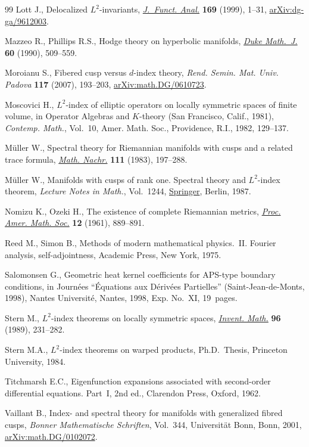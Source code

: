 \documentclass[10pt,a4paper]{amsart}
\numberwithin{equation}{section}
\begin{document}
\begin{thebibliography}{99}
Lott J., Delocalized {$L^2$}-invariants, \href{https://doi.org/10.1006/jfan.1999.3451}{\textit{J.~Funct. Anal.}} \textbf{169}
 (1999), 1--31, \href{https://arxiv.org/abs/dg-ga/9612003}{arXiv:dg-ga/9612003}.

Mazzeo R., Phillips R.S., Hodge theory on hyperbolic manifolds, \href{https://doi.org/10.1215/S0012-7094-90-06021-1}{\textit{Duke
 Math.~J.}} \textbf{60} (1990), 509--559.

Moroianu S., Fibered cusp versus {$d$}-index theory, \textit{Rend. Semin. Mat.
 Univ. Padova} \textbf{117} (2007), 193--203, \href{https://arxiv.org/abs/math.DG/0610723}{arXiv:math.DG/0610723}.

Moscovici H., {$L^{2}$}-index of elliptic operators on locally symmetric spaces
 of finite volume, in Operator Algebras and {$K$}-theory ({S}an {F}rancisco,
 {C}alif., 1981), \textit{Contemp. Math.}, Vol.~10, Amer. Math. Soc.,
 Providence, R.I., 1982, 129--137.

M\"uller W., Spectral theory for {R}iemannian manifolds with cusps and a
 related trace formula, \href{https://doi.org/10.1002/mana.19831110109}{\textit{Math. Nachr.}} \textbf{111} (1983), 197--288.

M\"uller W., Manifolds with cusps of rank one. {S}pectral theory and
 {$L^2$}-index theorem, \textit{Lecture Notes in Math.}, Vol.~1244,
 \href{https://doi.org/10.1007/BFb0077660}{Springer}, Berlin, 1987.

Nomizu K., Ozeki H., The existence of complete {R}iemannian metrics,
 \href{https://doi.org/10.2307/2034383}{\textit{Proc. Amer. Math. Soc.}} \textbf{12} (1961), 889--891.

Reed M., Simon B., Methods of modern mathematical physics.~{II}. {F}ourier
 analysis, self-adjointness, Academic Press, New York, 1975.

Salomonsen G., Geometric heat kernel coefficients for {APS}-type boundary
 conditions, in Journ\'ees ``\'Equations aux {D}\'eriv\'ees {P}artielles''
 ({S}aint-{J}ean-de-{M}onts, 1998), Nantes Universit\'e, Nantes, 1998, Exp.
 No.~XI, 19~pages.

Stern M., {$L^2$}-index theorems on locally symmetric spaces, \href{https://doi.org/10.1007/BF01393964}{\textit{Invent.
 Math.}} \textbf{96} (1989), 231--282.

Stern M.A., {$L^2$}-index theorems on warped products, Ph.D.~Thesis,
 {P}rinceton University, 1984.

Titchmarsh E.C., Eigenfunction expansions associated with second-order
 differential equations. {P}art~{I}, 2nd ed., Clarendon Press, Oxford, 1962.

Vaillant B., Index- and spectral theory for manifolds with generalized fibred
 cusps, \textit{Bonner Mathematische Schriften}, Vol.~344, Universit\"at Bonn,
 Bonn, 2001, \href{https://arxiv.org/abs/math.DG/0102072}{arXiv:math.DG/0102072}.

\end{thebibliography}
\end{document}
